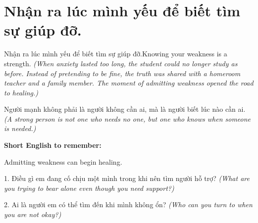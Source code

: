 \section{Nhận ra lúc mình yếu để biết tìm sự giúp đỡ.}
\begin{truyen}{Nhận ra lúc mình yếu để biết tìm sự giúp đỡ.}{Knowing your weakness is a strength.}
\textit{(When anxiety lasted too long, the student could no longer study as before. Instead of pretending to be fine, the truth was shared with a homeroom teacher and a family member. The moment of admitting weakness opened the road to healing.)}
\end{truyen}
\begin{baihoc}
Người mạnh không phải là người không cần ai, mà là người biết lúc nào cần ai.
\textit{(A strong person is not one who needs no one, but one who knows when someone is needed.)}
\end{baihoc}
\begin{ghinhoanh}
\textbf{Short English to remember:}

Admitting weakness can begin healing.
\end{ghinhoanh}
\begin{tuhocnhanh}
1. Điều gì em đang cố chịu một mình trong khi nên tìm người hỗ trợ? \textit{(What are you trying to bear alone even though you need support?)}

2. Ai là người em có thể tìm đến khi mình không ổn? \textit{(Who can you turn to when you are not okay?)}
\end{tuhocnhanh}
\ngancach
